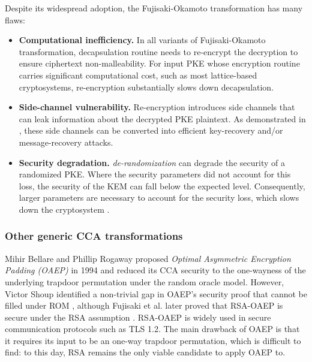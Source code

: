 \documentclass[runningheads]{llncs}
\begin{document}
Despite its widespread adoption, the Fujisaki-Okamoto transformation has many flaws: \begin{itemize}
    \item \textbf{Computational inefficiency.} In all variants of Fujisaki-Okamoto transformation, decapsulation routine needs to re-encrypt the decryption to ensure ciphertext non-malleability. For input PKE whose encryption routine carries significant computational cost, such as most lattice-based cryptosystems, re-encryption substantially slows down decapsulation.
    \item \textbf{Side-channel vulnerability.} Re-encryption introduces side channels that can leak information about the decrypted PKE plaintext. As demonstrated in \cite{DBLP:journals/tches/UenoXTITH22,DBLP:journals/tches/TanakaUXITH23,DBLP:conf/acns/Huguenin-Dumittan20,DBLP:conf/ccs/HermelinkN0S24,DBLP:journals/tches/GoyMGL24,DBLP:journals/iacr/LiCSCGLWW24,DBLP:journals/tches/KunduCSKMV24,DBLP:conf/acns/MondalKBKV24,DBLP:journals/tches/DongG25,DBLP:conf/acns/WangBD24}, these side channels can be converted into efficient key-recovery and/or message-recovery attacks.
    \item \textbf{Security degradation.} \textit{de-randomization} can degrade the security of a randomized PKE. Where the security parameters did not account for this loss, the security of the KEM can fall below the expected level. Consequently, larger parameters are necessary to account for the security loss, which slows down the cryptosystem \cite{cryptoeprint:2021/912,DBLP:journals/iacr/Bernstein21}.
\end{itemize}

\subsubsection{Other generic CCA transformations}
Mihir Bellare and Phillip Rogaway proposed \textit{Optimal Asymmetric Encryption Padding (OAEP)} in 1994 \cite{DBLP:conf/eurocrypt/BellareR94} and reduced its CCA security to the one-wayness of the underlying trapdoor permutation under the random oracle model. However, Victor Shoup identified a non-trivial gap in OAEP's security proof that cannot be filled under ROM \cite{DBLP:conf/crypto/Shoup01}, although Fujisaki et al. later proved that RSA-OAEP is secure under the RSA assumption \cite{DBLP:conf/crypto/FujisakiOPS01}. RSA-OAEP is widely used in secure communication protocols such as TLS 1.2. The main drawback of OAEP is that it requires its input to be an one-way trapdoor permutation, which is difficult to find: to this day, RSA remains the only viable candidate to apply OAEP to.
\end{document}
